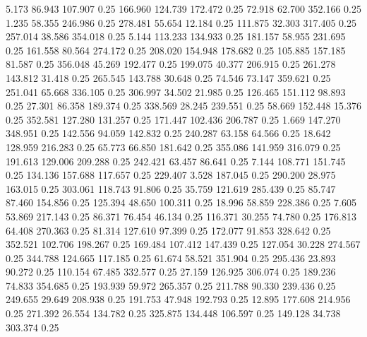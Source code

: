    5.173   86.943  107.907         0.25
 166.960  124.739  172.472         0.25
  72.918   62.700  352.166         0.25
   1.235   58.355  246.986         0.25
 278.481   55.654   12.184         0.25
 111.875   32.303  317.405         0.25
 257.014   38.586  354.018         0.25
   5.144  113.233  134.933         0.25
 181.157   58.955  231.695         0.25
 161.558   80.564  274.172         0.25
 208.020  154.948  178.682         0.25
 105.885  157.185   81.587         0.25
 356.048   45.269  192.477         0.25
 199.075   40.377  206.915         0.25
 261.278  143.812   31.418         0.25
 265.545  143.788   30.648         0.25
  74.546   73.147  359.621         0.25
 251.041   65.668  336.105         0.25
 306.997   34.502   21.985         0.25
 126.465  151.112   98.893         0.25
  27.301   86.358  189.374         0.25
 338.569   28.245  239.551         0.25
  58.669  152.448   15.376         0.25
 352.581  127.280  131.257         0.25
 171.447  102.436  206.787         0.25
   1.669  147.270  348.951         0.25
 142.556   94.059  142.832         0.25
 240.287   63.158   64.566         0.25
  18.642  128.959  216.283         0.25
  65.773   66.850  181.642         0.25
 355.086  141.959  316.079         0.25
 191.613  129.006  209.288         0.25
 242.421   63.457   86.641         0.25
   7.144  108.771  151.745         0.25
 134.136  157.688  117.657         0.25
 229.407    3.528  187.045         0.25
 290.200   28.975  163.015         0.25
 303.061  118.743   91.806         0.25
  35.759  121.619  285.439         0.25
  85.747   87.460  154.856         0.25
 125.394   48.650  100.311         0.25
  18.996   58.859  228.386         0.25
   7.605   53.869  217.143         0.25
  86.371   76.454   46.134         0.25
 116.371   30.255   74.780         0.25
 176.813   64.408  270.363         0.25
  81.314  127.610   97.399         0.25
 172.077   91.853  328.642         0.25
 352.521  102.706  198.267         0.25
 169.484  107.412  147.439         0.25
 127.054   30.228  274.567         0.25
 344.788  124.665  117.185         0.25
  61.674   58.521  351.904         0.25
 295.436   23.893   90.272         0.25
 110.154   67.485  332.577         0.25
  27.159  126.925  306.074         0.25
 189.236   74.833  354.685         0.25
 193.939   59.972  265.357         0.25
 211.788   90.330  239.436         0.25
 249.655   29.649  208.938         0.25
 191.753   47.948  192.793         0.25
  12.895  177.608  214.956         0.25
 271.392   26.554  134.782         0.25
 325.875  134.448  106.597         0.25
 149.128   34.738  303.374         0.25
